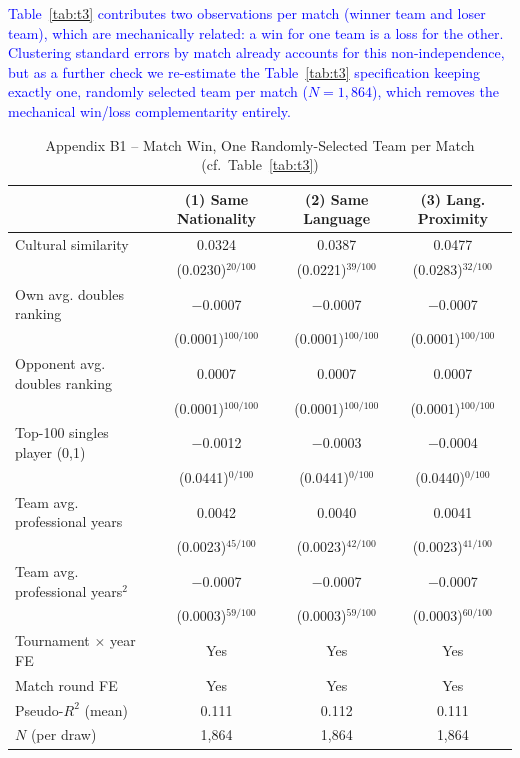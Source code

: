 \documentclass[10pt]{article}
\begin{document}
\textcolor{blue}{Table~\ref{tab:t3} contributes two observations per match (winner team and loser team), which are mechanically related: a win for one team is a loss for the other. Clustering standard errors by match already accounts for this non-independence, but as a further check we re-estimate the Table~\ref{tab:t3} specification keeping exactly one, randomly selected team per match ($N=1{,}864$), which removes the mechanical win/loss complementarity entirely.}

\begin{table}[htbp]
\centering
\caption{Appendix B1 -- Match Win, One Randomly-Selected Team per Match (cf.\ Table~\ref{tab:t3}) \label{tab:b1}}
\begin{threeparttable}
\begin{tabular}{lccc}
\toprule
 & (1) Same Nationality & (2) Same Language & (3) Lang. Proximity \\
\midrule
Cultural similarity & 0.0324 & 0.0387 & 0.0477 \\
 & (0.0230)$^{20/100}$ & (0.0221)$^{39/100}$ & (0.0283)$^{32/100}$ \\
Own avg. doubles ranking & $-$0.0007 & $-$0.0007 & $-$0.0007 \\
 & (0.0001)$^{100/100}$ & (0.0001)$^{100/100}$ & (0.0001)$^{100/100}$ \\
Opponent avg. doubles ranking & 0.0007 & 0.0007 & 0.0007 \\
 & (0.0001)$^{100/100}$ & (0.0001)$^{100/100}$ & (0.0001)$^{100/100}$ \\
Top-100 singles player (0,1) & $-$0.0012 & $-$0.0003 & $-$0.0004 \\
 & (0.0441)$^{0/100}$ & (0.0441)$^{0/100}$ & (0.0440)$^{0/100}$ \\
Team avg. professional years & 0.0042 & 0.0040 & 0.0041 \\
 & (0.0023)$^{45/100}$ & (0.0023)$^{42/100}$ & (0.0023)$^{41/100}$ \\
Team avg. professional years$^2$ & $-$0.0007 & $-$0.0007 & $-$0.0007 \\
 & (0.0003)$^{59/100}$ & (0.0003)$^{59/100}$ & (0.0003)$^{60/100}$ \\
\midrule
Tournament $\times$ year FE & Yes & Yes & Yes \\
Match round FE & Yes & Yes & Yes \\
Pseudo-$R^2$ (mean) & 0.111 & 0.112 & 0.111 \\
$N$ (per draw) & 1,864 & 1,864 & 1,864 \\
\bottomrule
\end{tabular}

\end{threeparttable}
\end{table}
\end{document}
